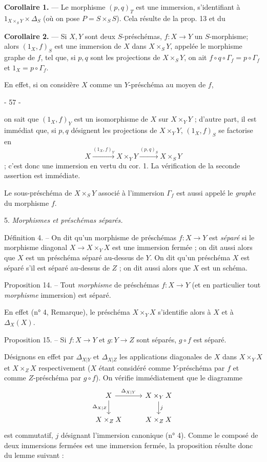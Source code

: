 \textbf{Corollaire 1.} — Le morphisme $(p, q)_T$ est une immersion, s'identifiant à $1_{X \times_S Y} \times \Delta_S$ (où on pose $P = S \times_S S$).
Cela résulte de la prop. 13 et du 

\textbf{Corollaire 2.} — Si $X, Y$ sont deux $S$-préschémas, $f: X \to Y$ un $S$-morphisme; alors $(1_X, f)_S$ est une immersion de $X$ dans $X \times_S Y$, appelée le morphisme graphe de $f$, tel que, si $p, q$ sont les projections de $X \times_S Y$, on ait $f \circ q \circ \Gamma_f = p \circ \Gamma_f$ et $1_X = p \circ \Gamma_f$.

En effet, si on considère $X$ comme un $Y$-préschéma au moyen de $f$,

\newpage


- 57 -

on sait que $(1_X, f)_Y$ est un isomorphisme de $X$ sur $X \times_Y Y$ ; d'autre part, il est immédiat que, si $p, q$ désignent les projections de $X \times_Y Y$, $(1_X, f)_S$ se factorise en
$$ X \xrightarrow{(1_X, f)_Y} X \times_Y Y \xrightarrow{(p, q)_S} X \times_S Y $$ ;
c'est donc une immersion en vertu du cor. 1. La vérification de la seconde assertion est immédiate.

Le sous-préschéma de $X \times_S Y$ associé à l'immersion $\Gamma_f$ est aussi appelé le \emph{graphe} du morphisme $f$.

5. \emph{Morphismes et préschémas séparés.}

Définition 4. -- On dit qu'un morphisme de préschémas $f : X \to Y$ est \emph{séparé} si le morphisme diagonal $X \to X \times_Y X$ est une immersion fermée ; on dit aussi alors que $X$ est un préschéma séparé au-dessus de $Y$. On dit qu'un préschéma $X$ est séparé s'il est séparé au-dessus de $Z$ ; on dit aussi alors que $X$ est un schéma.

Proposition 14. -- Tout \emph{morphisme} de préschémas $f : X \to Y$ (et en particulier tout \emph{morphisme} immersion) est séparé.

En effet (n° 4, Remarque), le préschéma $X \times_Y X$ s'identifie alors à $X$ et à $\Delta_X(X)$.

Proposition 15. -- Si $f : X \to Y$ et $g : Y \to Z$ sont séparés, $g \circ f$ est séparé.

Désignons en effet par $\Delta_{X|Y}$ et $\Delta_{X|Z}$ les applications diagonales de $X$ dans $X \times_Y X$ et $X \times_Z X$ respectivement ($X$ étant considéré comme $Y$-préschéma par $f$ et comme $Z$-préschéma par $g \circ f$). On vérifie immédiatement que le diagramme
$$
\begin{tikzcd}
X \arrow[d, "\Delta_{X|Z}"'] \arrow[r, "\Delta_{X|Y}"] & X \times_Y X \arrow[d, "j"] \\
X \times_Z X \arrow[r, phantom, ""{coordinate, name=Y}] & X \times_Z X
\end{tikzcd}
$$
est commutatif, $j$ désignant l'immersion canonique (n° 4). Comme le composé de deux immersions fermées est une immersion fermée, la proposition résulte donc du lemme suivant :

